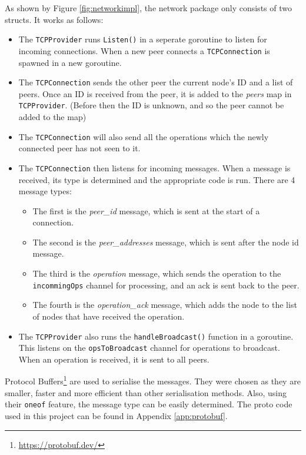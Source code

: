 \documentclass[12pt]{report}
\begin{document}
As shown by Figure \ref{fig:networkimpl}, the network package only consists of two structs. It works as follows: 
\begin{itemize}
    \item The \texttt{TCPProvider} runs \texttt{Listen()} in a seperate goroutine to listen for incoming connections. When a new peer connects a \texttt{TCPConnection} is spawned in a new goroutine.
    \item The \texttt{TCPConnection} sends the other peer the current node's ID and a list of peers. Once an ID is received from the peer, it is added to the \textit{peers} map in \texttt{TCPProvider}. (Before then the ID is unknown, and so the peer cannot be added to the map)
    \item The \texttt{TCPConnection} will also send all the operations which the newly connected peer has not seen to it.
    \item The \texttt{TCPConnection} then listens for incoming messages. When a message is received, its type is determined and the appropriate code is run. There are 4 message types:
    \begin{itemize}
        \item The first is the \textit{peer\_id} message, which is sent at the start of a connection. 
        \item The second is the \textit{peer\_addresses} message, which is sent after the node id message. 
        \item The third is the \textit{operation} message, which sends the operation to the \texttt{incommingOps} channel for processing, and an ack is sent back to the peer.
        \item The fourth is the \textit{operation\_ack} message, which adds the node to the list of nodes that have received the operation.
    \end{itemize} 
    \item The \texttt{TCPProvider} also runs the \texttt{handleBroadcast()} function in a goroutine. This listens on the \texttt{opsToBroadcast} channel for operations to broadcast. When an operation is received, it is sent to all peers. 
\end{itemize}
Protocol Buffers\footnote{\url{https://protobuf.dev/}} are used to serialise the messages. They were chosen as they are smaller, faster and more efficient than other serialisation methods. Also, using their \texttt{oneof} feature, the message type can be easily determined. The proto code used in this project can be found in Appendix \ref{app:protobuf}. \par
\end{document}
